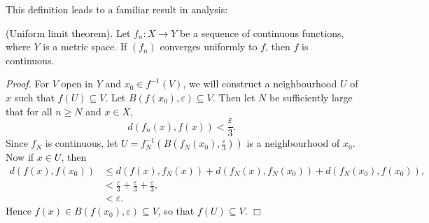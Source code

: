 This definition leads to a familiar result in analysis:
\begin{theorem}\label{2.71}
    (Uniform limit theorem). Let $f_n: X \rightarrow Y$ be a sequence of continuous functions, where $Y$ is a metric space. If $(f_n)$ converges uniformly to $f$, then $f$ is continuous.
\end{theorem}
{\it Proof.} For $V$ open in $Y$ and $x_0 \in f^{-1}(V)$, we will construct a neighbourhood $U$ of $x$ such that $f(U) \subseteq V$. Let $B(f(x_0), \varepsilon) \subseteq V$. Then let $N$ be sufficiently large that for all $n \geq N$ and $x \in X$,
$$d(f_n(x), f(x)) < \frac{\varepsilon}{3}.$$
Since $f_N$ is continuous, let $U = f_N^{-1}(B(f_N(x_0), \frac{\varepsilon}{3}))$ is a neighbourhood of $x_0$. Now if $x \in U$, then 
\begin{align*}
    d(f(x), f(x_0)) &\leq d(f(x), f_N(x)) + d(f_N(x), f_N(x_0)) + d(f_N(x_0), f(x_0)), \\
    &< \frac{\varepsilon}{3} + \frac{\varepsilon}{3} + \frac{\varepsilon}{3}, \\
    &< \varepsilon.
\end{align*}
Hence $f(x) \in B(f(x_0), \varepsilon) \subseteq V$, so that $f(U) \subseteq V$. $\Box$

